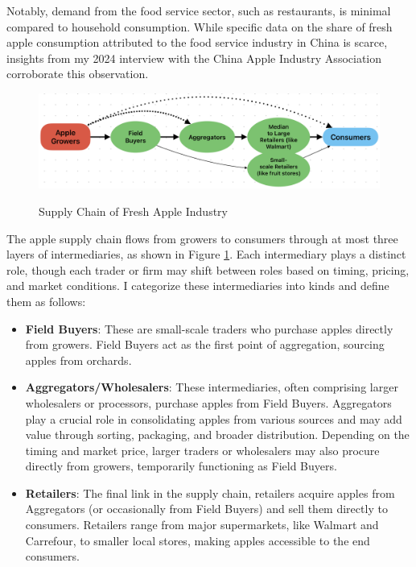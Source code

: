 Notably, demand from the food service sector, such as restaurants, is minimal compared to household consumption. While specific data on the share of fresh apple consumption attributed to the food service industry in China is scarce, insights from my 2024 interview with the China Apple Industry Association corroborate this observation.



\begin{figure}[hpt]
    \centering
        \caption{Supply Chain of Fresh Apple Industry}
    \includegraphics[width=\linewidth]{Figures/Supply_Chain_flow.png}
    \label{fig: supply chain flow}
\end{figure}
The apple supply chain flows from growers to consumers through at most three layers of intermediaries, as shown in Figure \ref{fig: supply chain flow}. Each intermediary plays a distinct role, though each trader or firm may shift between roles based on timing, pricing, and market conditions. I categorize these intermediaries into kinds and define them as follows:

\begin{itemize}
    \item \textbf{Field Buyers}: These are small-scale traders who purchase apples directly from growers. Field Buyers act as the first point of aggregation, sourcing apples from orchards.
    
    \item \textbf{Aggregators/Wholesalers}: These intermediaries, often comprising larger wholesalers or processors, purchase apples from Field Buyers. Aggregators play a crucial role in consolidating apples from various sources and may add value through sorting, packaging, and broader distribution. Depending on the timing and market price, larger traders or wholesalers may also procure directly from growers, temporarily functioning as Field Buyers.
    
    \item \textbf{Retailers}: The final link in the supply chain, retailers acquire apples from Aggregators (or occasionally from Field Buyers) and sell them directly to consumers. Retailers range from major supermarkets, like Walmart and Carrefour, to smaller local stores, making apples accessible to the end consumers.
\end{itemize}

